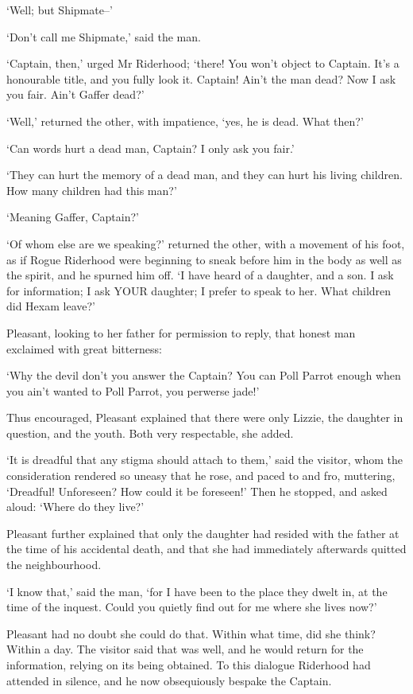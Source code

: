 ‘Well; but Shipmate--’

‘Don’t call me Shipmate,’ said the man.

‘Captain, then,’ urged Mr Riderhood; ‘there! You won’t object to
Captain. It’s a honourable title, and you fully look it. Captain! Ain’t
the man dead? Now I ask you fair. Ain’t Gaffer dead?’

‘Well,’ returned the other, with impatience, ‘yes, he is dead. What
then?’

‘Can words hurt a dead man, Captain? I only ask you fair.’

‘They can hurt the memory of a dead man, and they can hurt his living
children. How many children had this man?’

‘Meaning Gaffer, Captain?’

‘Of whom else are we speaking?’ returned the other, with a movement of
his foot, as if Rogue Riderhood were beginning to sneak before him in
the body as well as the spirit, and he spurned him off. ‘I have heard
of a daughter, and a son. I ask for information; I ask YOUR daughter; I
prefer to speak to her. What children did Hexam leave?’

Pleasant, looking to her father for permission to reply, that honest man
exclaimed with great bitterness:

‘Why the devil don’t you answer the Captain? You can Poll Parrot enough
when you ain’t wanted to Poll Parrot, you perwerse jade!’

Thus encouraged, Pleasant explained that there were only Lizzie, the
daughter in question, and the youth. Both very respectable, she added.

‘It is dreadful that any stigma should attach to them,’ said the
visitor, whom the consideration rendered so uneasy that he rose, and
paced to and fro, muttering, ‘Dreadful! Unforeseen? How could it be
foreseen!’ Then he stopped, and asked aloud: ‘Where do they live?’

Pleasant further explained that only the daughter had resided with the
father at the time of his accidental death, and that she had immediately
afterwards quitted the neighbourhood.

‘I know that,’ said the man, ‘for I have been to the place they dwelt
in, at the time of the inquest. Could you quietly find out for me where
she lives now?’

Pleasant had no doubt she could do that. Within what time, did she
think? Within a day. The visitor said that was well, and he would return
for the information, relying on its being obtained. To this dialogue
Riderhood had attended in silence, and he now obsequiously bespake the
Captain.


